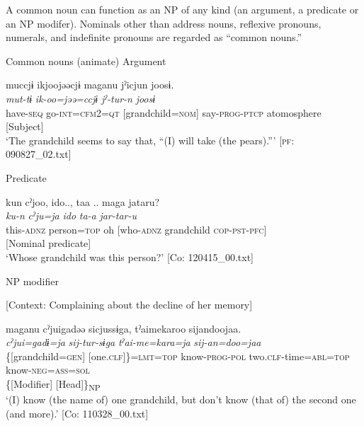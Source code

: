 A common noun can function as an NP of any kind (an argument, a predicate or an NP modifer). Nominals other than address nouns, reflexive pronouns, numerals, and indefinite pronouns are regarded as “common nouns.”

\ea \label{ex:7:1}  Common nouns (animate)
\ea \label{ex:7:a}Argument

{\TM}
\gllll  muccjɨ  ikjoojəəcjɨ  maganu  jˀicjun   joosɨ.\\
\textit{mut-tɨ}  \textit{ik-oo=jəə=ccjɨ}  \textit{}  \textit{jˀ-tur-n}   \textit{joosɨ}\\
have-\textsc{seq}  go-\textsc{int}=\textsc{cfm}2=\textsc{qt}  [grandchild=\textsc{nom}]  say-\textsc{prog}-\textsc{ptcp} atomosphere\\
{}[Subject]  \\
\glt ‘The grandchild seems to say that, “(I) will take (the pears).”’ [\textsc{pf}: 090827\_02.txt]

\ex \label{ex:7:b}Predicate

{\TM}
\gllll  kun  cˀjoo,  ido..,  taa ..  maga   jataru?\\
\textit{ku-n}  \textit{cˀju=ja}  \textit{ido}  \textit{ta-a}  \textit{} \textit{jar-tar-u}\\
this-\textsc{adnz}  person=\textsc{top}  oh  [who-\textsc{adnz}  grandchild \textsc{cop}-\textsc{pst}-\textsc{pfc}]\\
{}[Nominal predicate]\\
\glt ‘Whose grandchild was this person?’ [Co: 120415\_00.txt]

\ex \label{ex:7:c}NP modifier

    [Context: Complaining about the decline of her memory]

{\TM}
\gllll  maganu  cˀjuigadəə  sicjussɨga,                                tˀaimekaroo  sijandoojaa.\\
\textit{}  \textit{cˀjui=gadɨ=ja}  \textit{sij-tur-sɨga}         \textit{tˀai-me=kara=ja}  \textit{sij-an=doo=jaa}\\
\{[grandchild=\textsc{gen}]  [one.\textsc{clf}]\}=\textsc{lmt}=\textsc{top}  know-\textsc{prog}-\textsc{pol}                  two.\textsc{clf}-time=\textsc{abl}=\textsc{top}  know-\textsc{neg}=\textsc{ass}=\textsc{sol}\\
\{[Modifier]  [Head]\}\textsubscript{NP}  \\
\glt ‘(I) know (the name of) one grandchild, but don’t know (that of) the second one (and more).’ [Co: 110328\_00.txt]

